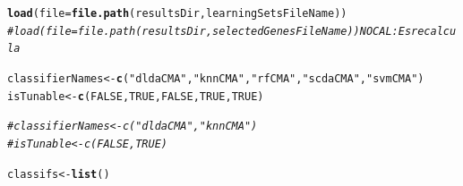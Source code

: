 \documentclass{article}\usepackage[]{graphicx}\usepackage[]{color}
\makeatletter
\newcommand{\hlnum}[1]{\textcolor[rgb]{0.686,0.059,0.569}{#1}}%
\newcommand{\hlstr}[1]{\textcolor[rgb]{0.192,0.494,0.8}{#1}}%
\newcommand{\hlcom}[1]{\textcolor[rgb]{0.678,0.584,0.686}{\textit{#1}}}%
\newcommand{\hlstd}[1]{\textcolor[rgb]{0.345,0.345,0.345}{#1}}%
\newcommand{\hlkwb}[1]{\textcolor[rgb]{0.69,0.353,0.396}{#1}}%
\newcommand{\hlkwc}[1]{\textcolor[rgb]{0.333,0.667,0.333}{#1}}%
\newcommand{\hlkwd}[1]{\textcolor[rgb]{0.737,0.353,0.396}{\textbf{#1}}}%
\newenvironment{kframe}{%
 \def\at@end@of@kframe{}%
 \ifinner\ifhmode%
  \def\at@end@of@kframe{\end{minipage}}%
  \begin{minipage}{\columnwidth}%
 \fi\fi%
 \def\FrameCommand##1{\hskip\@totalleftmargin \hskip-\fboxsep
 \colorbox{shadecolor}{##1}\hskip-\fboxsep
     \hskip-\linewidth \hskip-\@totalleftmargin \hskip\columnwidth}%
 \MakeFramed {\advance\hsize-\width
   \@totalleftmargin\z@ \linewidth\hsize
   \@setminipage}}%
 {\par\unskip\endMakeFramed%
 \at@end@of@kframe}
\newenvironment{knitrout}{}{} %
\makeatother
\begin{document}
\begin{knitrout}
\color{fgcolor}\begin{kframe}
\begin{alltt}
\hlkwd{load}\hlstd{(}\hlkwc{file}\hlstd{=}\hlkwd{file.path}\hlstd{(resultsDir, learningSetsFileName))}
\hlcom{# load(file=file.path(resultsDir, selectedGenesFileName)) NO CAL: Es recalcula}

\hlstd{classifierNames} \hlkwb{<-} \hlkwd{c}\hlstd{(}\hlstr{"dldaCMA"}\hlstd{,} \hlstr{"knnCMA"}\hlstd{,} \hlstr{"rfCMA"}\hlstd{,} \hlstr{"scdaCMA"}\hlstd{,} \hlstr{"svmCMA"}\hlstd{)}
\hlstd{isTunable} \hlkwb{<-} \hlkwd{c}\hlstd{(}\hlnum{FALSE}\hlstd{,} \hlnum{TRUE}\hlstd{,} \hlnum{FALSE}\hlstd{,} \hlnum{TRUE}\hlstd{,} \hlnum{TRUE}\hlstd{)}

\hlcom{#classifierNames <- c("dldaCMA", "knnCMA")}
\hlcom{#isTunable <- c(FALSE, TRUE)}

\hlstd{classifs} \hlkwb{<-} \hlkwd{list}\hlstd{()}


\end{alltt}
\end{kframe}
\end{knitrout}
\end{document}
